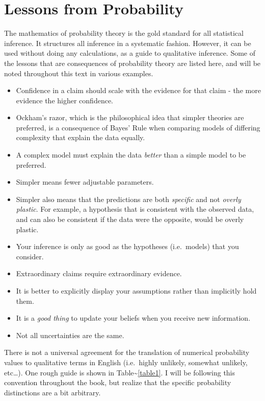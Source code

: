\documentclass{tufte-book}
\begin{document}
\section{Lessons from Probability}\label{lessons-from-probability}

The mathematics of probability theory is the gold standard for all
statistical inference. It structures all inference in a systematic
fashion. However, it can be used without doing any calculations, as a
guide to qualitative inference. Some of the lessons that are
consequences of probability theory are listed here, and will be noted
throughout this text in various examples.

\begin{itemize}
\itemsep1pt\parskip0pt
\item
  Confidence in a claim should scale with the evidence for that claim -
  the more evidence the higher confidence.
\item
  Ockham's razor, which is the philosophical idea that simpler theories
  are preferred, is a consequence of Bayes' Rule when comparing models
  of differing complexity that explain the data equally.
\item
  A complex model must explain the data \emph{better} than a simple
  model to be preferred.
\item
  Simpler means fewer adjustable parameters.
\item
  Simpler also means that the predictions are both \emph{specific} and
  not \emph{overly plastic}. For example, a hypothesis that is
  consistent with the observed data, and can also be consistent if the
  data were the opposite, would be overly plastic.
\item
  Your inference is only as good as the hypotheses (i.e.~models) that
  you consider.
\item
  Extraordinary claims require extraordinary evidence.\citep{sagandemon}
\item
  It is better to explicitly display your assumptions rather than
  implicitly hold them.
\item
  It is a \emph{good thing} to update your beliefs when you receive new
  information.
\item
  Not all uncertainties are the same.
\end{itemize}

There is not a universal agreement for the translation of numerical
probability values to qualitative terms in English (i.e.~highly
unlikely, somewhat unlikely, etc\ldots{}). One rough guide is shown in
Table\textasciitilde{}\ref{table1}. I will be following this convention
throughout the book, but realize that the specific probability
distinctions are a bit arbitrary.
\end{document}
